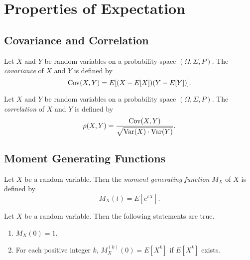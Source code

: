 \chapter{Properties of Expectation}
\section{Covariance and Correlation}
\begin{definition}
  Let $X$ and $Y$ be random variables on a probability space
  $(\Omega, \Sigma, P)$.
  The \emph{covariance} of $X$ and $Y$ is defined by
  \begin{equation*}
    \operatorname{Cov}(X, Y) = E[(X - E[X])(Y - E[Y])].
  \end{equation*}
\end{definition}

\begin{definition}
  Let $X$ and $Y$ be random variables on a probability space
  $(\Omega, \Sigma, P)$.
  The \emph{correlation} of $X$ and $Y$ is defined by
  \begin{equation*}
    \rho(X, Y) = \frac{\operatorname{Cov}(X, Y)}{\sqrt{\operatorname{Var}(X) \cdot \operatorname{Var}(Y)}}.
  \end{equation*}
\end{definition}

\section{Moment Generating Functions}
\begin{definition}
  Let $X$ be a random variable.
  Then the \emph{moment generating function} $M_X$ of $X$ is defined by
  \begin{equation*}
    M_X(t) = E[e^{tX}].
  \end{equation*}
\end{definition}

\begin{proposition}
  Let $X$ be a random variable.
  Then the following statements are true.
  \begin{enumerate}
    \item $M_X(0) = 1$.
    \item For each positive integer $k$, $M_X^{(k)}(0) = E[X^k]$
      if $E[X^k]$ exists.
  \end{enumerate}
\end{proposition}